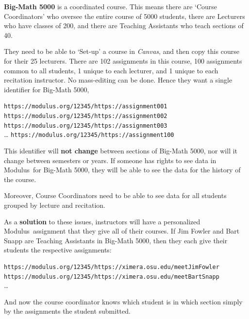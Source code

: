 \documentclass{techbrief}
\newcommand{\modulus}{\textsf{Modulus}}
\begin{document}
\begin{xframe}
    \textbf{Big-Math 5000} is a coordinated course. This means there are
    `Course Coordinators' who oversee the entire course of 5000 students,
    there are Lecturers who have classes of 200, and there are Teaching
    Assistants who teach sections of 40. 

    They need to be able to `Set-up' a course in \textsl{Canvas}, and then copy
    this course for their 25 lecturers. There are 102 assignments in this
    course, 100 assignments common to all students, 1 unique to each lecturer, and 1 unique to each recitation
    instructor. No mass-editing can be done. Hence they want a single identifier for
    Big-Math 5000,
    \begin{center}\scriptsize
        \texttt{https://modulus.org/12345/https://assignment001}\\
        \texttt{https://modulus.org/12345/https://assignment002}\\
        \texttt{https://modulus.org/12345/https://assignment003}\\
        \dots
        \texttt{https://modulus.org/12345/https://assignment100}\\
    \end{center}
    This identifier will \textbf{not change} between sections of Big-Math 5000,
    nor will it change between semesters or years. If someone has rights to see
    data in \modulus\ for Big-Math 5000, they will be able to see the data for
    the history of the course.

    Moreover, Course Coordinators need to be able to see data for all students
    grouped by lecture and recitation.

    As a \textbf{solution} to these issues, instructors will have a
    personalized
    \modulus\ assignment that they give all of their courses. If Jim Fowler and
    Bart Snapp are Teaching Assistants in Big-Math 5000, then they each give
    their
    students the respective assignments:
    \begin{center}\scriptsize

        \texttt{https://modulus.org/12345/https://ximera.osu.edu/meetJimFowler}\\

        \texttt{https://modulus.org/12345/https://ximera.osu.edu/meetBartSnapp}\\
        \dots
    \end{center}
    And now the course coordinator knows which student is in which section
    simply by the assignments the student submitted.
\end{xframe}
\end{document}
